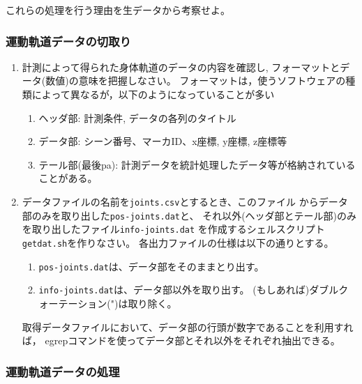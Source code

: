 \documentclass{jsarticle}
\begin{document}
これらの処理を行う理由を生データから考察せよ。

\subsubsection{運動軌道データの切取り}

\begin{enumerate}
\item 計測によって得られた身体軌道のデータの内容を確認し, フォーマットとデータ(数値)の意味を把握しなさい。
  フォーマットは，使うソフトウェアの種類によって異なるが，以下のようになっていることが多い
  \begin{enumerate}
  \item ヘッダ部: 計測条件, データの各列のタイトル
  \item データ部: シーン番号、マーカID、x座標, y座標, z座標等
  \item テール部(最後pa): 計測データを統計処理したデータ等が格納されていることがある。
  \end{enumerate}
\item データファイルの名前を\verb|joints.csv|とするとき、このファイル
  からデータ部のみを取り出した\verb|pos-joints.dat|と、
  それ以外(ヘッダ部とテール部)のみを取り出したファイル\verb|info-joints.dat|
  を作成するシェルスクリプト\verb|getdat.sh|を作りなさい。
  各出力ファイルの仕様は以下の通りとする。
  \begin{enumerate}
  \item \verb|pos-joints.dat|は、データ部をそのままとり出す。
  \item \verb|info-joints.dat|は、データ部以外を取り出す。
    (もしあれば)ダブルクォーテーション(")は取り除く。
  \end{enumerate}
  取得データファイルにおいて、データ部の行頭が数字であることを利用すれば，
  egrepコマンドを使ってデータ部とそれ以外をそれぞれ抽出できる。
\end{enumerate}


\subsubsection{運動軌道データの処理}
\end{document}
